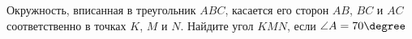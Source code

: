 \begin{ex}
	\begin{condition}
		Окружность, вписанная в треугольник \( ABC \), касается его сторон \( AB \), \( BC \) и \( AC \) соответственно в точках \( K \), \( M \) и \( N \). Найдите угол \( KMN \), если \( \angle A = 70\degree \)
	\end{condition}
\end{ex}